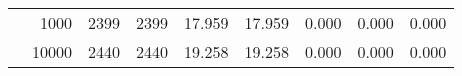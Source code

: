 \begin{table}
\begin{tabular}{rrrrrrrrr}
	            
					 &  
					 
					\multirow{ 1 }{*}{ 1000 } &
					
						
							    
							     2399  & 2399  
	                           & 17.959 & 17.959 & 0.000
	                           & 0.000 & 0.000  \\
	                
	            
					 &  
					 
					\multirow{ 1 }{*}{ 10000 } &
					
						
							    
							     2440  & 2440  
	                           & 19.258 & 19.258 & 0.000
	                           & 0.000 & 0.000  \\
	                
	            
	        

\hline

\end{tabular}
\end{table}
\clearpage


	    

